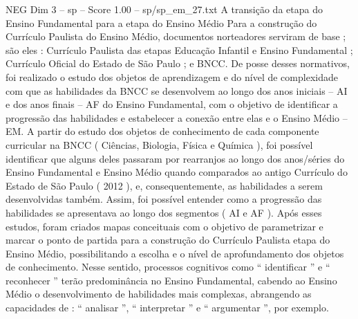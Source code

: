 \begin{textsample}{NEG Dim 3 – sp – Score 1.00 – sp/sp\_em\_27.txt}  \label{ex:f3_neg_084}
A transição da etapa do Ensino Fundamental para a etapa do Ensino Médio Para a construção do Currículo Paulista do Ensino Médio, documentos norteadores serviram de base ; são eles : Currículo Paulista das etapas Educação Infantil e Ensino Fundamental ; Currículo Oficial do Estado de São Paulo ; e BNCC.
De posse desses normativos, foi realizado o estudo dos objetos de aprendizagem e do nível de complexidade com que as habilidades da BNCC se desenvolvem ao longo dos anos iniciais – AI e dos anos finais – AF do Ensino Fundamental, com o objetivo de identificar a progressão das habilidades e estabelecer a conexão entre elas e o Ensino Médio – EM.
A partir do estudo dos objetos de conhecimento de cada componente curricular na BNCC ( Ciências, Biologia, Física e Química ), foi possível identificar que alguns deles passaram por rearranjos ao longo dos anos/séries do Ensino Fundamental e Ensino Médio quando comparados ao antigo Currículo do Estado de São Paulo ( 2012 ), e, consequentemente, as habilidades a serem desenvolvidas também.
Assim, foi possível entender como a progressão das habilidades se apresentava ao longo dos segmentos ( AI e AF ).
Após esses estudos, foram criados mapas conceituais com o objetivo de parametrizar e marcar o ponto de partida para a construção do Currículo Paulista etapa do Ensino Médio, possibilitando a escolha e o nível de aprofundamento dos objetos de conhecimento.
Nesse sentido, processos cognitivos como “ identificar ” e “ reconhecer ” terão predominância no Ensino Fundamental, cabendo ao Ensino Médio o desenvolvimento de habilidades mais complexas, abrangendo as capacidades de : “ analisar ”, “ interpretar ” e “ argumentar ”, por exemplo.

\end{textsample}
